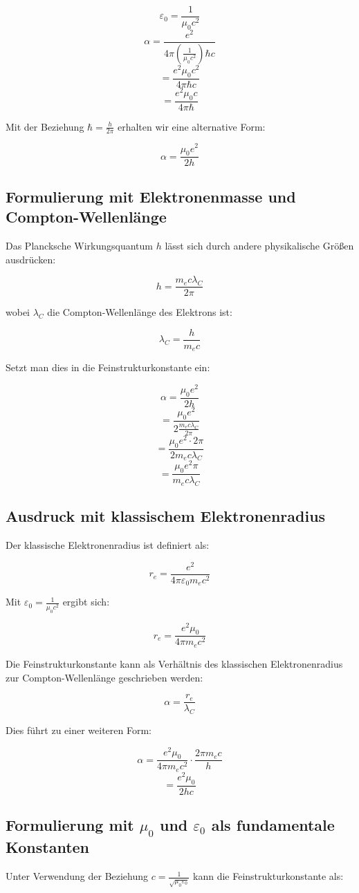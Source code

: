 \documentclass{article}
\begin{document}
	$$\varepsilon_0 = \frac{1}{\mu_0c^2}$$
	$$\alpha = \frac{e^2}{4\pi\left(\frac{1}{\mu_0c^2}\right)\hbar c}$$
	$$= \frac{e^2\mu_0c^2}{4\pi\hbar c}$$
	$$= \frac{e^2\mu_0c}{4\pi\hbar}$$
	
	Mit der Beziehung $\hbar = \frac{h}{2\pi}$ erhalten wir eine alternative Form:
	
	$$\alpha = \frac{\mu_0e^2}{2h}$$
	
	\subsection{Formulierung mit Elektronenmasse und Compton-Wellenlänge}
	Das Plancksche Wirkungsquantum $h$ lässt sich durch andere physikalische Größen ausdrücken:
	
	$$h = \frac{m_e c \lambda_C}{2\pi}$$
	
	wobei $\lambda_C$ die Compton-Wellenlänge des Elektrons ist:
	
	$$\lambda_C = \frac{h}{m_e c}$$
	
	Setzt man dies in die Feinstrukturkonstante ein:
	
	$$\alpha = \frac{\mu_0e^2}{2h}$$
	$$= \frac{\mu_0e^2}{2\frac{m_e c \lambda_C}{2\pi}}$$
	$$= \frac{\mu_0e^2 \cdot 2\pi}{2m_e c \lambda_C}$$
	$$= \frac{\mu_0e^2\pi}{m_e c \lambda_C}$$
	
	\subsection{Ausdruck mit klassischem Elektronenradius}
	Der klassische Elektronenradius ist definiert als:
	
	$$r_e = \frac{e^2}{4\pi\varepsilon_0 m_e c^2}$$
	
	Mit $\varepsilon_0 = \frac{1}{\mu_0c^2}$ ergibt sich:
	
	$$r_e = \frac{e^2\mu_0}{4\pi m_e c^2}$$
	
	Die Feinstrukturkonstante kann als Verhältnis des klassischen Elektronenradius zur Compton-Wellenlänge geschrieben werden:
	
	$$\alpha = \frac{r_e}{\lambda_C}$$
	
	Dies führt zu einer weiteren Form:
	
	$$\alpha = \frac{e^2\mu_0}{4\pi m_e c^2} \cdot \frac{2\pi m_e c}{h}$$
	$$= \frac{e^2\mu_0}{2hc}$$
	
	\subsection{Formulierung mit $\mu_0$ und $\varepsilon_0$ als fundamentale Konstanten}
	Unter Verwendung der Beziehung $c = \frac{1}{\sqrt{\mu_0\varepsilon_0}}$ kann die Feinstrukturkonstante als:
	
\end{document}
